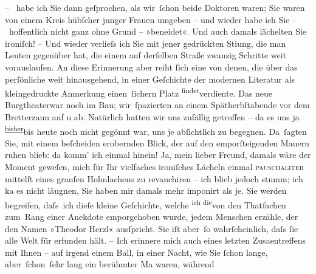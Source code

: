 \pstart
           – \label{K_L03901-5v}\label{K_L03901-5} habe ich
               Sie dann geſprochen, als wir ſchon beide Doktoren waren; Sie waren von einem Kreis
               hübſcher junger Frauen umgeben – und wieder habe ich Sie – hoffentlich nicht ganz
               ohne Grund – »beneidet«. Und auch damals lächelten Sie ironiſch! – Und wieder
               verlieſs ich {\pb}Sie mit jener gedrückten Sti{\geminationm}ung, die man Leuten gegenüber hat, die einem auf
               derſelben Straße zwanzig Schritte weit vorauslaufen. An diese Erinnerung aber reiht{ }ſich eine von denen, die über das perſönliche weit hinausgehend, in einer Geſchichte
               der modernen Literatur als kleingedruckte Anmerkung einen ſichern Platz \substVorne{}\textsuperscript{findet}\substDazwischen{}verdiente\substHinten{}. Das neue Burgtheaterwar noch im Bau; wir ſpazierten an einem Spätherbſtabende
               vor dem Bretterzaun auf u ab. Natürlich hatten wir uns zufällig getroffen – da es
               uns ja \substVorne{}\textsuperscript{\uline{bisher}}\substDazwischen{}bis heute\substHinten{} noch nicht gegönnt war, uns je abſichtlich zu begegnen. Da ſagten Sie, mit
               einem beſcheiden erobernden Blick, der auf den emporſteigenden Mauern ruhen blieb: da
               komm’ ich einmal hinein! {\pb}Ja, mein lieber Freund, damals
               wäre der Moment geweſen, mich für Ihr vielfaches ironiſches Lächeln einmal \textsc{pauschaliter} mittelſt eines grauſen Hohnlachens zu
               revanchiren – ich blieb jedoch stumm; ich ka{\geminationn} es
                  \introOben{}nicht\introOben{} läugnen, Sie haben mir damals mehr imponirt als je. Sie werden
               begreifen, daſs ich dieſe kleine Geſchichte, welche \substVorne{}\textsuperscript{ich die}\substDazwischen{}von den\substHinten{} Thatſachen zum Rang {\pb}einer Anekdote emporgehoben
               wurde, jedem Menschen erzähle, der den Namen »Theodor Herzl« ausſpricht. Sie iſt
               aber ſo wahrſcheinlich, daſs{ }ſie alle Welt für erfunden hält. – Ich erinnere mich
               auch eines letzten Zusa{\geminationm}entreffens mit Ihnen – auf
               irgend einem Ball, in einer Nacht, wie Sie{ }ſchon lange, aber ſchon ſehr lang ein
               berühmter Ma{\geminationn} waren, {\pb}während
